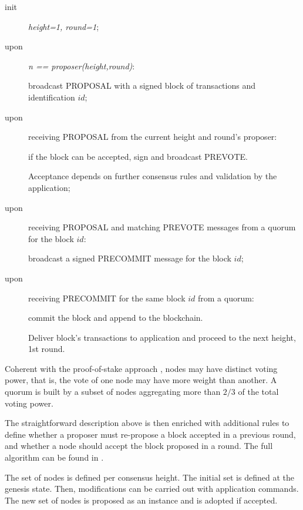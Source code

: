   

\begin{description}
\item[init] \textit{height=1, round=1};
\item[upon] \textit{n == proposer(height,round)}: 

broadcast PROPOSAL  with a signed block of transactions and identification $id$;

\item[upon] receiving \textsc{PROPOSAL} from the current height and round's proposer:  

if the block can be accepted, sign and broadcast \textsc{PREVOTE}.  

Acceptance depends on further consensus rules and validation by the application;

\item[upon] receiving \textsc{PROPOSAL} and matching \textsc{PREVOTE} messages from a quorum for the block $id$: 

broadcast a signed \textsc{PRECOMMIT} message for the block $id$;

\item[upon] receiving \textsc{PRECOMMIT} for the same block $id$ from a quorum: 

commit the block and append to the blockchain.  

 Deliver block's transactions to application and proceed to the next height, 1st round.  
\end{description}

Coherent with the proof-of-stake approach \cite{Poelstra2015DistributedCF}, nodes may have distinct voting power, that is, the vote of one node may have more weight than another.
A quorum is built by a subset of nodes aggregating more than $2/3$ of the total voting power.  

The straightforward description above is then enriched with additional rules to define whether a proposer must re-propose a block accepted in a previous round, and whether a node should accept the block proposed in a round.  The full algorithm can be found in \cite{buchman2019latestgossipbftconsensus}. 


The set of nodes is defined per consensus height.  The initial set is defined at the genesis state.  Then, modifications can be carried out with application commands.  The new set of nodes is proposed as an instance and is adopted if accepted.



